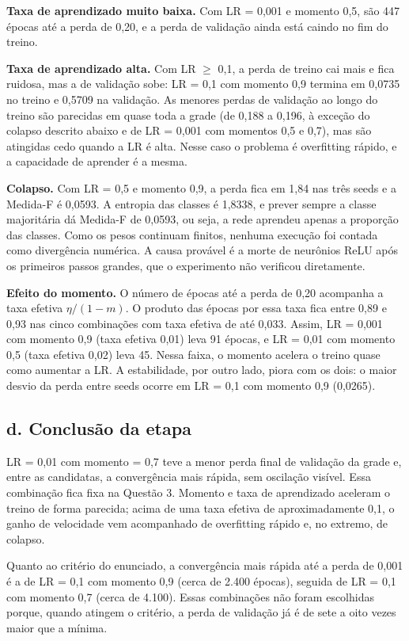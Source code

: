 \textbf{Taxa de aprendizado muito baixa.} Com LR = 0,001 e momento 0,5, são 447 épocas até a perda de 0,20, e a perda de
validação ainda está caindo no fim do treino.

\textbf{Taxa de aprendizado alta.} Com LR $\ge$ 0,1, a perda de treino cai mais e fica ruidosa, mas a de validação sobe:
LR = 0,1 com momento 0,9 termina em 0,0735 no treino e 0,5709 na validação. As menores perdas de validação ao longo do treino são
parecidas em quase toda a grade (de 0,188 a 0,196, à exceção do colapso descrito abaixo e de LR = 0,001 com momentos 0,5 e 0,7), mas são atingidas cedo
quando a LR é alta. Nesse caso o problema é overfitting rápido, e a capacidade de aprender é a mesma.

\textbf{Colapso.} Com LR = 0,5 e momento 0,9, a perda fica em 1,84 nas três seeds e a Medida-F é 0,0593. A entropia das classes
é 1,8338, e prever sempre a classe majoritária dá Medida-F de 0,0593, ou seja, a rede aprendeu apenas a proporção das
classes. Como os pesos continuam finitos, nenhuma execução foi contada como divergência numérica. A causa provável é a morte de
neurônios ReLU após os primeiros passos grandes, que o experimento não verificou diretamente.

\textbf{Efeito do momento.} O número de épocas até a perda de 0,20 acompanha a taxa efetiva $\eta/(1-m)$. O produto das épocas por essa
taxa fica entre 0,89 e 0,93 nas cinco combinações com taxa efetiva de até 0,033. Assim, LR = 0,001 com momento 0,9 (taxa efetiva 0,01)
leva 91 épocas, e LR = 0,01 com momento 0,5 (taxa efetiva 0,02) leva 45. Nessa faixa, o momento acelera o treino quase como aumentar a
LR. A estabilidade, por outro lado, piora com os dois: o maior desvio da perda entre seeds ocorre em
LR = 0,1 com momento 0,9 (0,0265).

\subsection*{d. Conclusão da etapa}

LR = 0,01 com momento = 0,7 teve a menor perda final de validação da grade e, entre as candidatas, a convergência mais rápida,
sem oscilação visível. Essa combinação fica fixa na Questão 3. Momento e taxa de aprendizado aceleram o treino de forma parecida;
acima de uma taxa efetiva de aproximadamente 0,1, o ganho de velocidade vem acompanhado de overfitting rápido e, no extremo, de colapso.

Quanto ao critério do enunciado, a convergência mais rápida até a perda de 0,001 é a de LR = 0,1 com momento 0,9 (cerca de 2.400 épocas), seguida
de LR = 0,1 com momento 0,7 (cerca de 4.100). Essas combinações não foram escolhidas porque, quando atingem o critério, a perda de validação já é
de sete a oito vezes maior que a mínima.

\FloatBarrier
